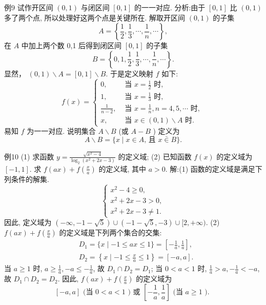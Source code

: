 例9 试作开区间 $(0,1)$ 与闭区间 $[0,1]$ 的一一对应.
分析:由于 $[0,1]$ 比 $(0,1)$ 多了两个点, 所以处理好这两个点是关键所在.
解取开区间 $(0,1)$ 的子集
$$
A=\left\{\frac{1}{2}, \frac{1}{3}, \cdots, \frac{1}{n}, \cdots\right\},
$$
在 $A$ 中加上两个数 0,1 后得到闭区间 $[0,1]$ 的子集
$$
B=\left\{0,1, \frac{1}{2}, \frac{1}{3}, \cdots, \frac{1}{n}, \cdots\right\} .
$$
显然， $(0,1) \backslash A=[0,1] \backslash B$. 于是定义映射 $f$ 如下:
$$
f(x)= \begin{cases}0, & \text { 当 } x=\frac{1}{2} \text { 时, } \\ 1, & \text { 当 } x=\frac{1}{3} \text { 时, } \\ \frac{1}{n-2}, & \text { 当 } x=\frac{1}{n}, n=4,5, \cdots \text { 时, } \\ x, & \text { 当 } x \in(0,1) \backslash A \text { 时.
}\end{cases}
$$
易知 $f$ 为一一对应.
说明集合 $A \backslash B$ (或 $A-B$ ) 定义为
$$
A \backslash B=\{x \mid x \in A \text {, 且 } x \bar{\in} B\} .
$$



例10 (1) 求函数 $y=\frac{\sqrt{x^2-4}}{\log _2\left(x^2+2 x-3\right)}$ 的定义域;
(2) 已知函数 $f(x)$ 的定义域为 $[-1,1]$. 求 $f(a x)+f\left(\frac{x}{a}\right)$ 的定义域, 其中 $a>0$.
解:(1) 函数的定义域是满足下列条件的解集.
$$
\left\{\begin{array}{l}
x^2-4 \geqslant 0, \\
x^2+2 x-3>0, \\
x^2+2 x-3 \neq 1 .
\end{array}\right.
$$
因此, 定义域为 $(-\infty,-1-\sqrt{5}) \cup(-1-\sqrt{5},-3) \cup[2,+\infty)$.
(2) $f(a x)+f\left(\frac{x}{a}\right)$ 的定义域是下列两个集合的交集:
$$
\begin{aligned}
& D_1=\{x \mid-1 \leqslant a x \leqslant 1\}=\left[-\frac{1}{a}, \frac{1}{a}\right], \\
& D_2=\left\{x \mid-1 \leqslant \frac{x}{a} \leqslant 1\right\}=[-a, a] .
\end{aligned}
$$
当 $a \geqslant 1$ 时, $a \geqslant \frac{1}{a},-a \leqslant-\frac{1}{a}$, 故 $D_1 \cap D_2=D_1$;
当 $0<a<1$ 时, $\frac{1}{a}>a,-\frac{1}{a}<-a$, 故 $D_1 \cap D_2=D_2$.
因此, $f(a x)+f\left(\frac{x}{a}\right)$ 的定义域为
$$
[-a, a] \text { (当 } 0<a<1 \text { ) 或 }\left[-\frac{1}{a}, \frac{1}{a}\right] \text { (当 } a \geqslant 1 \text { ). }
$$



